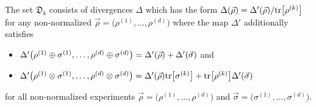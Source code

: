 \documentclass[12pt,a4paper,reqno]{amsart}
\theoremstyle{definition}
\newcommand{\mf}[1]{\mathfrak{#1}}
\newcommand{\tr}[1]{\mathrm{tr}\left[#1\right]} %
\let\originalleft\left
\let\originalright\right
\renewcommand{\left}{\mathopen{}\mathclose\bgroup\originalleft}
\renewcommand{\right}{\aftergroup\egroup\originalright}
\begin{document}
The set $\mf D_k$ consists of divergences $\Delta$ which has the form $\Delta(\vec{\rho})=\Delta'(\vec{\rho})/\tr{\rho^{(k)}}$ for any non-normalized $\vec{\rho}=\big(\rho^{(1)},\ldots,\rho^{(d)}\big)$ where the map $\Delta'$ additionally satisfies
\begin{itemize}
\item[(k1)] $\Delta'\left(\rho^{(1)}\oplus\sigma^{(1)},\ldots,\rho^{(d)}\oplus\sigma^{(d)}\right)=\Delta'(\vec{\rho})+\Delta'(\vec{\sigma})$ and
\item[(k2)] $\Delta'\left(\rho^{(1)}\otimes\sigma^{(1)},\ldots,\rho^{(d)}\otimes\sigma^{(d)}\right)=\Delta'(\vec{\rho})\tr{\sigma^{(k)}}+\tr{\rho^{(k)}}\Delta'(\vec{\sigma})$
\end{itemize}
for all non-normalized experiments $\vec{\rho}=\big(\rho^{(1)},\ldots,\rho^{(d)}\big)$ and $\vec{\sigma}=\big(\sigma^{(1)},\ldots,\sigma^{(d)}\big)$.
\end{document}

